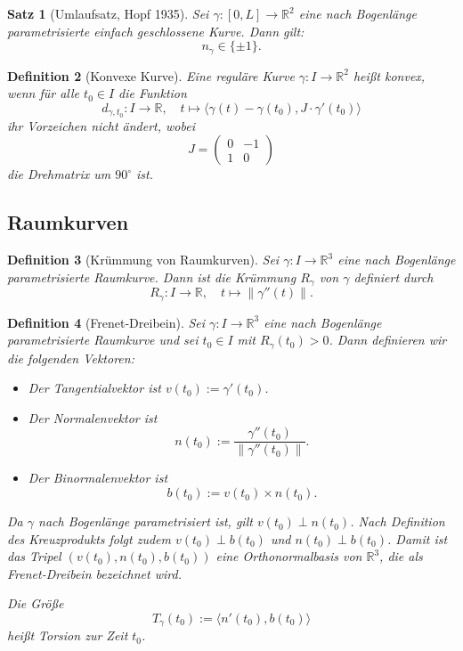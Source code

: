 \documentclass[a4paper,12pt]{article}
\theoremstyle{break}
\newtheorem{definition}{Definition}[section]
\newtheorem{theorem}[definition]{Satz}
\begin{document}
\begin{theorem}[Umlaufsatz, Hopf 1935]
Sei \( \gamma: [0,L] \to \mathbb{R}^2 \) eine nach Bogenlänge parametrisierte einfach geschlossene Kurve.  
Dann gilt:
\[
n_{\gamma} \in \{ \pm 1 \}.
\]
\end{theorem}

\begin{definition}[Konvexe Kurve]
Eine reguläre Kurve \( \gamma: I \to \mathbb{R}^2 \) heißt \emph{konvex}, wenn für alle \( t_0 \in I \) die Funktion  
\[
d_{\gamma,t_0} : I \to \mathbb{R}, \quad t \mapsto \langle \gamma(t) - \gamma(t_0), J \cdot \gamma'(t_0) \rangle
\]
ihr Vorzeichen nicht ändert, wobei  
\[
J = \begin{pmatrix} 0 & -1 \\ 1 & 0 \end{pmatrix}
\]
die Drehmatrix um \( 90^\circ \) ist.
\end{definition}

\subsection{Raumkurven}

\begin{definition}[Krümmung von Raumkurven]
Sei \( \gamma: I \to \mathbb{R}^3 \) eine nach Bogenlänge parametrisierte Raumkurve.  
Dann ist die \emph{Krümmung} \( R_{\gamma} \) von \( \gamma \) definiert durch  
\[
R_{\gamma}: I \to \mathbb{R}, \quad t \mapsto \|\gamma''(t)\|.
\]
\end{definition}

\begin{definition}[Frenet-Dreibein]
Sei \( \gamma: I \to \mathbb{R}^3 \) eine nach Bogenlänge parametrisierte Raumkurve und sei \( t_0 \in I \) mit \( R_{\gamma}(t_0) > 0 \).  
Dann definieren wir die folgenden Vektoren:  
\begin{itemize}
    \item Der \emph{Tangentialvektor} ist \( v(t_0) := \gamma'(t_0) \).
    \item Der \emph{Normalenvektor} ist  
    \[
    n(t_0) := \frac{\gamma''(t_0)}{\|\gamma''(t_0)\|}.
    \]
    \item Der \emph{Binormalenvektor} ist  
    \[
    b(t_0) := v(t_0) \times n(t_0).
    \]
\end{itemize}
Da \( \gamma \) nach Bogenlänge parametrisiert ist, gilt \( v(t_0) \perp n(t_0) \).  
Nach Definition des Kreuzprodukts folgt zudem \( v(t_0) \perp b(t_0) \) und \( n(t_0) \perp b(t_0) \).  
Damit ist das Tripel \( (v(t_0), n(t_0), b(t_0)) \) eine \emph{Orthonormalbasis} von \( \mathbb{R}^3 \), die als \emph{Frenet-Dreibein} bezeichnet wird.  

Die Größe  
\[
T_{\gamma}(t_0) := \langle n'(t_0), b(t_0) \rangle
\]
heißt \emph{Torsion} zur Zeit \( t_0 \).
\end{definition}
\end{document}
